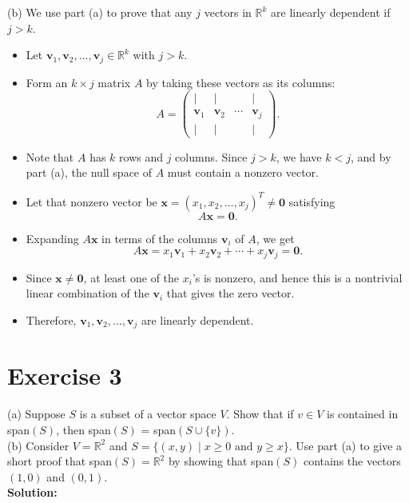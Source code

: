\documentclass{article}
\begin{document}
(b) We use part (a) to prove that any $j$ vectors in $\mathbb{R}^k$ are linearly dependent if $j > k$.

\begin{itemize}
\item Let $\mathbf{v}_1,\mathbf{v}_2,\dots,\mathbf{v}_j \in \mathbb{R}^k$ with $j > k$. 
\item Form an $k \times j$ matrix $A$ by taking these vectors as its columns:
\[
A = 
\begin{pmatrix}
| & | &  & | \\
\mathbf{v}_1 & \mathbf{v}_2 & \cdots & \mathbf{v}_j \\
| & | &  & |
\end{pmatrix}.
\]
\item Note that $A$ has $k$ rows and $j$ columns. Since $j > k$, we have $k < j$, and by part (a), the null space of $A$ must contain a nonzero vector. 
\item Let that nonzero vector be $\mathbf{x} = (x_1, x_2, \dots, x_j)^T \neq \mathbf{0}$ satisfying
\[
A \mathbf{x} = \mathbf{0}.
\]
\item Expanding $A\mathbf{x}$ in terms of the columns $\mathbf{v}_i$ of $A$, we get
\[
A\mathbf{x} = x_1 \mathbf{v}_1 + x_2 \mathbf{v}_2 + \cdots + x_j \mathbf{v}_j = \mathbf{0}.
\]
\item Since $\mathbf{x} \neq \mathbf{0}$, at least one of the $x_i$'s is nonzero, and hence this is a nontrivial linear combination of the $\mathbf{v}_i$ that gives the zero vector.
\item Therefore, $\mathbf{v}_1,\mathbf{v}_2,\dots,\mathbf{v}_j$ are linearly dependent.
\end{itemize}

\newpage

\section*{Exercise 3}
(a) Suppose $S$ is a subset of a vector space $V$. Show that if $v \in V$ is contained in span$(S)$, then span$(S)$ = span$(S \cup \{v\})$. \\

\noindent
(b) Consider $V = \mathbb{R}^2$ and $S = \{(x,y) \mid x \geq 0 \text{ and } y \geq x\}$. Use part (a) to give a short proof that span$(S) = \mathbb{R}^2$ by showing that span$(S)$ contains the vectors $(1,0)$ and $(0,1)$. \\

\textbf{Solution:} \\
\end{document}
